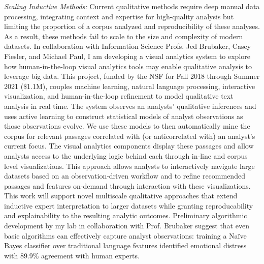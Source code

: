 \documentclass[11pt]{article}
\begin{document}
\emph{Scaling Inductive Methods:} Current qualitative methods require deep manual data processing, integrating context and expertise for high-quality analysis but limiting the proportion of a corpus analyzed and reproducibility of these analyses. As a result, these methods fail to scale to the size and complexity of modern datasets. 
In collaboration with Information Science Profs. Jed Brubaker, Casey Fiesler, and Michael Paul, I am developing a visual analytics system to explore how human-in-the-loop visual analytics tools may enable qualitative analysis to leverage big data.  This project, funded by the NSF for Fall 2018 through Summer 2021 (\$1.1M), couples machine learning, natural language processing, interactive visualization, and human-in-the-loop refinement to model qualitative text analysis in real time. The system observes an analysts' qualitative inferences and uses active learning to construct statistical models of analyst observations as those observations evolve. We use these models to then automatically mine the corpus for relevant passages correlated with (or anticorrelated with) an analyst's current focus. The visual analytics components display these passages and allow analysts access to the underlying logic behind each through in-line and corpus level visualizations. This approach allows analysts to interactively navigate large datasets based on an observation-driven workflow and to refine recommended passages and features on-demand through interaction with these visualizations.
This work will support novel multiscale qualitative approaches that extend inductive expert interpretation to larger datasets while granting reproducability and explainability to the resulting analytic outcomes.
Preliminary algorithmic development by my lab in collaboration with Prof. Brubaker suggest that even basic algorithms can effectively capture analyst observations: training a Na\"ive Bayes classifier over traditional language features identified emotional distress with 89.9\% agreement with human experts.
\end{document}
